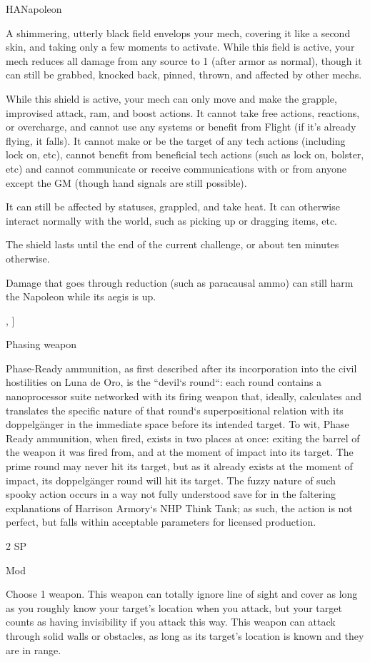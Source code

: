 \begin{mech}{HA}{Napoleon}
{A shimmering, utterly black field envelops your mech, covering it like a second skin, and taking only a few moments to activate. While this field is active, your mech reduces all damage from any source to 1 (after armor as normal), though it can still be grabbed, knocked back, pinned, thrown, and affected by other mechs.

While this shield is active, your mech can only move and make the grapple, improvised attack, ram, and boost actions. It cannot take free actions, reactions, or overcharge, and cannot use any systems or benefit from Flight (if it’s already flying, it falls). It cannot make or be the target of any tech actions (including lock on, etc), cannot benefit from beneficial tech actions (such as lock on, bolster, etc) and cannot communicate or receive communications with or from anyone except the GM (though hand signals are still possible).

It can still be affected by statuses, grappled, and take heat. It can otherwise interact normally with the world, such as picking up or dragging items, etc.

The shield lasts until the end of the current challenge, or about ten minutes otherwise.

Damage that goes through reduction (such as paracausal ammo) can still harm the Napoleon while its aegis is up.},
]


Phasing weapon

Phase-Ready ammunition, as first described after its incorporation into the civil hostilities on Luna de Oro, is the “devil‘s round“: each round contains a nanoprocessor suite networked with its firing weapon that, ideally, calculates and translates the specific nature of that round‘s superpositional relation with its doppelgänger in the immediate space before its intended target. To wit, Phase Ready ammunition, when fired, exists in two places at once: exiting the barrel of the weapon it was fired from, and at the moment of impact into its target. The prime round may never hit its target, but as it already exists at the moment of impact, its doppelgänger round will hit its target. The fuzzy nature of such spooky action occurs in a way not fully understood save for in the faltering explanations of Harrison Armory‘s NHP Think Tank; as such, the action is not perfect, but falls within acceptable parameters for licensed production.

2 SP

Mod

Choose 1 weapon. This weapon can totally ignore line of sight and cover as long as you roughly know your target’s location when you attack, but your target counts as having invisibility if you attack this way. This weapon can attack through solid walls or obstacles, as long as its target’s location is known and they are in range.



\end{mech}
